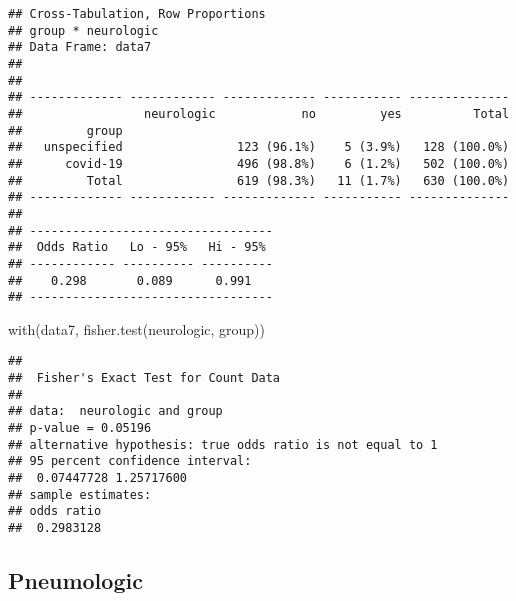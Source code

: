 \documentclass[
]{article}
\newenvironment{Shaded}{\begin{snugshade}}{\end{snugshade}}
\newcommand{\AttributeTok}[1]{\textcolor[rgb]{0.77,0.63,0.00}{#1}}
\newcommand{\ConstantTok}[1]{\textcolor[rgb]{0.00,0.00,0.00}{#1}}
\newcommand{\FunctionTok}[1]{\textcolor[rgb]{0.00,0.00,0.00}{#1}}
\newcommand{\NormalTok}[1]{#1}
\newcommand{\SpecialCharTok}[1]{\textcolor[rgb]{0.00,0.00,0.00}{#1}}
\newcommand{\StringTok}[1]{\textcolor[rgb]{0.31,0.60,0.02}{#1}}
\begin{document}
\begin{verbatim}
## Cross-Tabulation, Row Proportions  
## group * neurologic  
## Data Frame: data7  
## 
## 
## ------------- ------------ ------------- ----------- --------------
##                 neurologic            no         yes          Total
##         group                                                      
##   unspecified                123 (96.1%)    5 (3.9%)   128 (100.0%)
##      covid-19                496 (98.8%)    6 (1.2%)   502 (100.0%)
##         Total                619 (98.3%)   11 (1.7%)   630 (100.0%)
## ------------- ------------ ------------- ----------- --------------
## 
## ----------------------------------
##  Odds Ratio   Lo - 95%   Hi - 95% 
## ------------ ---------- ----------
##    0.298       0.089      0.991   
## ----------------------------------
\end{verbatim}

\begin{Shaded}
\begin{Highlighting}[]
\FunctionTok{with}\NormalTok{(data7, }\FunctionTok{fisher.test}\NormalTok{(neurologic, group))}
\end{Highlighting}
\end{Shaded}

\begin{verbatim}
## 
##  Fisher's Exact Test for Count Data
## 
## data:  neurologic and group
## p-value = 0.05196
## alternative hypothesis: true odds ratio is not equal to 1
## 95 percent confidence interval:
##  0.07447728 1.25717600
## sample estimates:
## odds ratio 
##  0.2983128
\end{verbatim}

\hypertarget{pneumologic}{%
\subsection{Pneumologic}\label{pneumologic}}

\begin{Shaded}
\end{Shaded}
\end{document}
